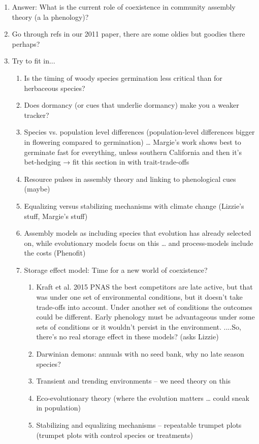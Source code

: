 \documentclass[11pt]{article}
\begin{document}
\begin{enumerate}
\item Answer: What is the current role of coexistence in community assembly theory (a la phenology)?
\item Go through refs in our 2011 paper, there are some oldies but goodies there perhaps?
\item Try to fit in... 
\begin{enumerate}
\item Is the timing of woody species germination less critical than for herbaceous species?
\item Does dormancy (or cues that underlie dormancy) make you a weaker tracker?
\item Species vs. population level differences (population-level differences bigger in flowering compared to germination) … Margie’s work shows best to germinate fast for everything, unless southern California and then it’s bet-hedging → fit this section in with trait-trade-offs
\item Resource pulses in assembly theory and linking to phenological cues (maybe)
\item Equalizing versus stabilizing mechanisms with climate change (Lizzie’s stuff, Margie’s stuff)
\item Assembly models as including species that evolution has already selected on, while evolutionary models focus on this … and process-models include the costs (Phenofit)
\item Storage effect model: Time for a new world of coexistence?
\begin{enumerate}
\item Kraft et al. 2015 PNAS the best competitors are late active, but that was under one set of environmental conditions, but it doesn’t take trade-offs into account. Under another set of conditions the outcomes could be different. Early phenology must be advantageous under some sets of conditions or it wouldn’t persist in the environment. ....So, there’s no real storage effect in these models? (asks Lizzie)
\item Darwinian demons: annuals with no seed bank, why no late season species?
\item Transient and trending environments – we need theory on this
\item Eco-evolutionary theory (where the evolution matters … could sneak in population)
\item Stabilizing and equalizing mechanisms – repeatable trumpet plots (trumpet plots with control species or treatments)

\end{enumerate}
\end{enumerate}
\end{enumerate}
\end{document}
